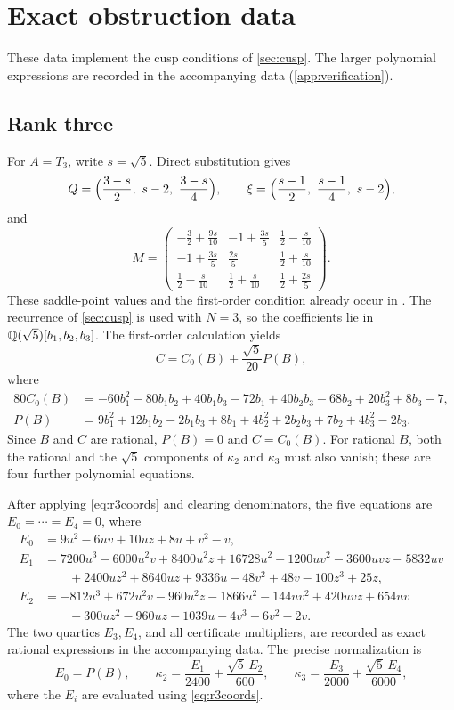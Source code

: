 \section{Exact obstruction data}\label{app:data}

These data implement the cusp conditions of \cref{sec:cusp}. The larger polynomial expressions are recorded in the accompanying data (\cref{app:verification}).

\subsection{Rank three}\label{app:r3}
For $A=T_3$, write $s=\sqrt5$. Direct substitution gives
\[
Q=\Bigl(\frac{3-s}2,\ s-2,\ \frac{3-s}4\Bigr),\qquad \xi=\Bigl(\frac{s-1}2,\ \frac{s-1}4,\ s-2\Bigr),
\]
and
\[
M=\begin{pmatrix}-\frac32+\frac{9s}{10}&-1+\frac{3s}5&\frac12-\frac s{10}\\[2pt] -1+\frac{3s}5&\frac{2s}5&\frac12+\frac s{10}\\[2pt] \frac12-\frac s{10}&\frac12+\frac s{10}&\frac12+\frac{2s}5\end{pmatrix}.
\]
These saddle-point values and the first-order condition already occur in \cite[Section~4.1]{MW24}. The recurrence of \cref{sec:cusp} is used with $N=3$, so the coefficients lie in $\mathbb{Q}(\sqrt5)[b_1,b_2,b_3]$. The first-order calculation yields
\begin{equation}\label{eq:r3first}
C=C_0(B)+\frac{\sqrt5}{20}P(B),
\end{equation}
where
\begin{align*}
80C_0(B)&=-60b_1^2-80b_1b_2+40b_1b_3-72b_1+40b_2b_3-68b_2+20b_3^2+8b_3-7,\\
P(B)&=9b_1^2+12b_1b_2-2b_1b_3+8b_1+4b_2^2+2b_2b_3+7b_2+4b_3^2-2b_3.
\end{align*}
Since $B$ and $C$ are rational, $P(B)=0$ and $C=C_0(B)$. For rational $B$, both the rational and the $\sqrt5$ components of $\kappa_2$ and $\kappa_3$ must also vanish; these are four further polynomial equations.

After applying \eqref{eq:r3coords} and clearing denominators, the five equations are $E_0=\cdots=E_4=0$, where
\begin{align*}
E_0&=9u^2-6uv+10uz+8u+v^2-v,\\
E_1&=7200u^3-6000u^2v+8400u^2z+16728u^2+1200uv^2-3600uvz-5832uv\\
&\qquad+2400uz^2+8640uz+9336u-48v^2+48v-100z^3+25z,\\
E_2&=-812u^3+672u^2v-960u^2z-1866u^2-144uv^2+420uvz+654uv\\
&\qquad-300uz^2-960uz-1039u-4v^3+6v^2-2v.
\end{align*}
The two quartics $E_3,E_4$, and all certificate multipliers, are recorded as exact rational expressions in the accompanying data. The precise normalization is
\[
E_0=P(B),\qquad \kappa_2=\frac{E_1}{2400}+\frac{\sqrt5\,E_2}{600},\qquad \kappa_3=\frac{E_3}{2000}+\frac{\sqrt5\,E_4}{6000},
\]
where the $E_i$ are evaluated using \eqref{eq:r3coords}.

